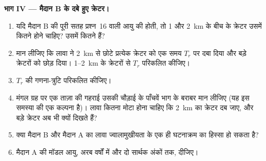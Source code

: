 \begin{problem}[{सप्ताहांत समस्या --- मंगल का क्रोड और दो
काल्पनिक लावा मैदानों की आयु}]
\medskip\noindent\textbf{भाग IV --- मैदान B के दबे हुए क्रेटर।}
\begin{enumerate}[resume]
\item यदि मैदान B की पूरी सतह प्रश्न~16 वाली आयु की होती, तो 1 और \qty{2}{km} के बीच के क्रेटर
  उसमें कितने होने चाहिए? उसमें कितने हैं?
\item मान लीजिए कि लावा ने \qty{2}{km} से छोटे प्रत्येक क्रेटर को
  एक समय $T_r$ पर दबा दिया और बड़े क्रेटरों को छोड़ दिया। \num{1}--\qty{2}{km} के
  क्रेटरों से $T_r$ परिकलित कीजिए।
\item $T_r$ की गणना-त्रुटि परिकलित कीजिए।
\item मंगल ग्रह पर एक ताज़ा  की गहराई उसकी चौड़ाई के
  पाँचवें भाग के बराबर मान लीजिए (यह इस समस्या की एक कल्पना है)। लावा कितना मोटा होना चाहिए कि
  \qty{2}{km} का क्रेटर दब जाए, और बड़े क्रेटर अब भी क्यों दिखते हैं?
\item क्या मैदान B और मैदान A का लावा ज्वालामुखीयता के एक ही
  घटनाक्रम का हिस्सा हो सकता है?
\item मैदान A की मॉडल आयु, अरब वर्षों में और दो सार्थक अंकों तक,
  दीजिए।
\end{enumerate}
\end{problem}
